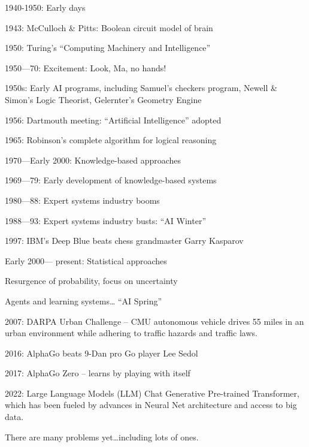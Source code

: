 \begin{listu}
    \item 1940-1950: Early days
    \begin{listu}
        \item 1943: McCulloch \& Pitts: Boolean circuit model of brain
        \item 1950: Turing's “Computing Machinery and Intelligence”
    \end{listu}

    \item 1950—70: Excitement: Look, Ma, no hands!
    \begin{listu}
        \item 1950s: Early AI programs, including Samuel's checkers program, Newell \& Simon's Logic Theorist, Gelernter's Geometry Engine
        \item 1956: Dartmouth meeting: “Artificial Intelligence” adopted
        \item 1965: Robinson's complete algorithm for logical reasoning
    \end{listu}

    \item 1970—Early 2000: Knowledge-based approaches
    \begin{listu}
        \item 1969—79: Early development of knowledge-based systems
        \item 1980—88: Expert systems industry booms
        \item 1988—93: Expert systems industry busts: “AI Winter”
        \item 1997: IBM's Deep Blue beats chess grandmaster Garry Kasparov
    \end{listu}

    \item Early 2000— present: Statistical approaches
    \begin{listu}
        \item Resurgence of probability, focus on uncertainty
        \item Agents and learning systems… “AI Spring”
        \item 2007: DARPA Urban Challenge -- CMU autonomous vehicle drives 55 miles in an urban environment while adhering to traffic hazards and traffic laws.
        \item 2016: AlphaGo beats 9-Dan pro Go player Lee Sedol
        \item 2017: AlphaGo Zero -- learns by playing with itself
        \item 2022: Large Language Models (LLM) Chat Generative Pre-trained Transformer, which has been fueled by advances in Neural Net architecture and access to big data.
    \end{listu}
\end{listu}

There are many  problems yet\dots including lots of  ones.